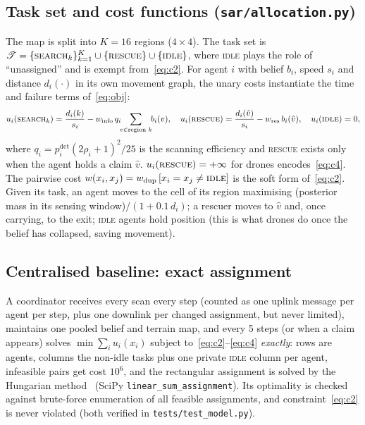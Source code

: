 \documentclass{article}
\newcommand{\T}{\mathscr{T}}
\begin{document}
\subsection{Task set and cost functions (\texttt{sar/allocation.py})}
The map is split into $K=16$ regions ($4\times4$). The task set is $\T=\{\textsc{search}_k\}_{k=1}^{K}\cup\{\textsc{rescue}\}\cup\{\textsc{idle}\}$,
where \textsc{idle} plays the role of ``unassigned'' and is exempt from~\eqref{eq:c2}. For agent $i$ with belief $b_i$,
speed $s_i$ and distance $d_i(\cdot)$ in its own movement graph, the unary costs instantiate the time and failure terms
of~\eqref{eq:obj}:
\begin{equation}
u_i(\textsc{search}_k)=\frac{d_i(k)}{s_i}-w_{\mathrm{info}}\,q_i\!\!\sum_{v\in\text{region }k}\!\! b_i(v),\quad
u_i(\textsc{rescue})=\frac{d_i(\hat v)}{s_i}-w_{\mathrm{res}}\,b_i(\hat v),\quad u_i(\textsc{idle})=0,
\end{equation}
where $q_i=p^{\mathrm{det}}_i(2\rho_i+1)^2/25$ is the scanning efficiency and \textsc{rescue} exists only when the agent
holds a claim $\hat v$. $u_i(\textsc{rescue})=+\infty$ for drones encodes~\eqref{eq:c4}. The pairwise cost
$w(x_i,x_j)=w_{\mathrm{dup}}\,[x_i=x_j\neq\textsc{idle}]$ is the soft form of~\eqref{eq:c2}. Given its task, an agent moves
to the cell of its region maximising (posterior mass in its sensing window)$/(1+0.1\,d_i)$; a rescuer moves to $\hat v$
and, once carrying, to the exit; \textsc{idle} agents hold position (this is what drones do once the belief has
collapsed, saving movement).

\subsection{Centralised baseline: exact assignment}
A coordinator receives every scan every step (counted as one uplink message per agent per step, plus one downlink per
changed assignment, but never limited), maintains one pooled belief and terrain map, and every 5 steps (or when a
claim appears) solves
$\min\sum_i u_i(x_i)$ subject to~\eqref{eq:c2}--\eqref{eq:c4} \emph{exactly}: rows are agents, columns the non-idle tasks
plus one private \textsc{idle} column per agent, infeasible pairs get cost $10^6$, and the rectangular assignment is
solved by the Hungarian method~\cite{kuhn1955} (SciPy \texttt{linear\_sum\_assignment}). Its optimality is
checked against brute-force enumeration of all feasible assignments, and constraint~\eqref{eq:c2} is never violated
(both verified in \texttt{tests/test\_model.py}).
\end{document}
